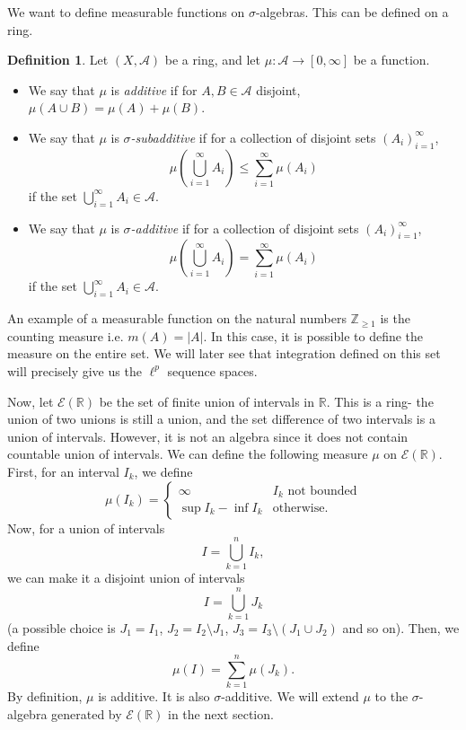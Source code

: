 \documentclass[a4paper, openany]{memoir}
\theoremstyle{definition}
\newtheorem{definition}{Definition}[section]
\theoremstyle{plain}
\begin{document}
    We want to define measurable functions on $\sigma$-algebras. This can be defined on a ring.
    \begin{definition}
        Let $(X, \mathcal{A})$ be a ring, and let $\mu \colon \mathcal{A} \to [0, \infty]$ be a function.
        \begin{itemize}
            \item We say that $\mu$ is \emph{additive} if for $A, B \in \mathcal{A}$ disjoint, $\mu(A \cup B) = \mu(A) + \mu(B)$.
            \item We say that $\mu$ is \emph{$\sigma$-subadditive} if for a collection of disjoint sets $(A_i)_{i=1}^\infty$,
            \[\mu \left(\bigcup_{i=1}^\infty A_i\right) \leq \sum_{i=1}^\infty \mu(A_i)\]
            if the set $\bigcup_{i=1}^\infty A_i \in \mathcal{A}$.
            \item We say that $\mu$ is \emph{$\sigma$-additive} if for a collection of disjoint sets $(A_i)_{i=1}^\infty$,
            \[\mu \left(\bigcup_{i=1}^\infty A_i\right) = \sum_{i=1}^\infty \mu(A_i)\]
            if the set $\bigcup_{i=1}^\infty A_i \in \mathcal{A}$.
        \end{itemize}
    \end{definition}
    An example of a measurable function on the natural numbers $\mathbb{Z}_{\geq 1}$ is the counting measure i.e. $m(A) = |A|$. In this case, it is possible to define the measure on the entire set. We will later see that integration defined on this set will precisely give us the $\ell^p$ sequence spaces.

    Now, let $\mathcal{E}(\mathbb{R})$ be the set of finite union of intervals in $\mathbb{R}$. This is a ring- the union of two unions is still a union, and the set difference of two intervals is a union of intervals. However, it is not an algebra since it does not contain countable union of intervals. We can define the following measure $\mu$ on $\mathcal{E}(\mathbb{R})$. First, for an interval $I_k$, we define
    \[\mu(I_k) = \begin{cases}
        \infty & I_k \textrm{ not bounded} \\
        \sup I_k - \inf I_k & \textrm{otherwise}.
    \end{cases}\]
    Now, for a union of intervals
    \[I = \bigcup_{k=1}^n I_k,\]
    we can make it a disjoint union of intervals
    \[I = \bigcup_{k=1}^n J_k\]
    (a possible choice is $J_1 = I_1$, $J_2 = I_2 \setminus J_1$, $J_3 = I_3 \setminus (J_1 \cup J_2)$ and so on). Then, we define
    \[\mu(I) = \sum_{k=1}^n \mu(J_k).\]
    By definition, $\mu$ is additive. It is also $\sigma$-additive. We will extend $\mu$ to the $\sigma$-algebra generated by $\mathcal{E}(\mathbb{R})$ in the next section.
    \newpage
\end{document}
